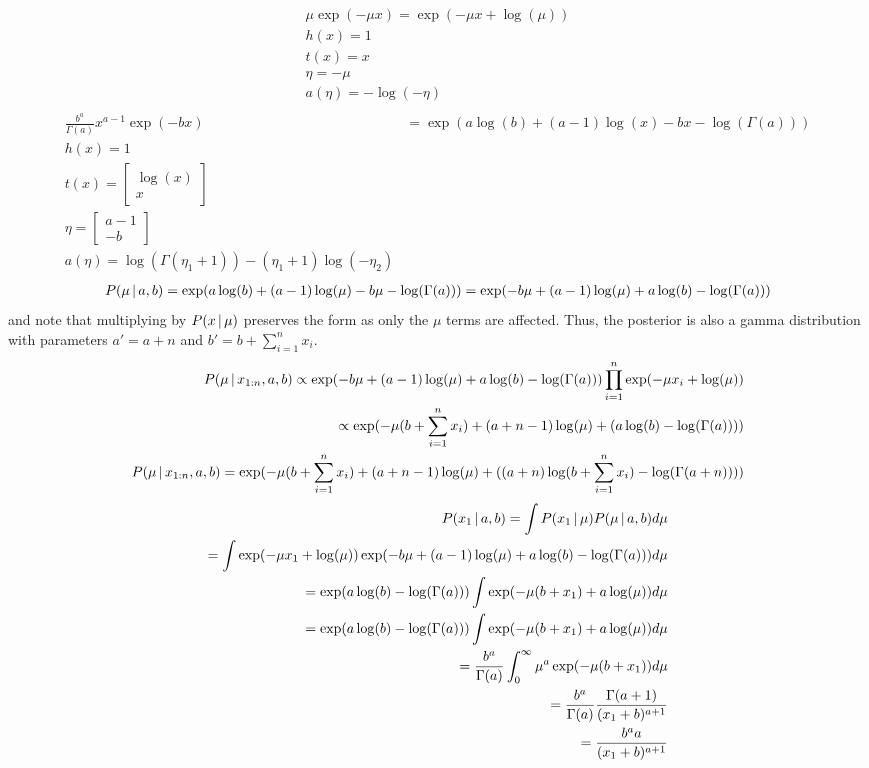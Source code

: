 \documentclass[hidequestions]{homework}
\begin{document}
%
\problem
\subproblem 
\begin{align*}
    \mu\exp(-\mu x) = \exp(-\mu x + \log(\mu))\\
    h(x) = 1\\
    t(x) = x\\
    \eta = -\mu\\
    a(\eta) = -\log(-\eta)\\
\end{align*}
\begin{align*}
    \frac{b^a}{\Gamma(a)}x^{a-1}\exp(-bx) &= \exp(a\log(b) + (a-1)\log(x) - bx - \log(\Gamma(a)))\\
    h(x) = 1\\
    t(x) = \begin{bmatrix}
        \log(x)\\
        x
    \end{bmatrix}\\
    \eta = \begin{bmatrix}
        a-1\\
        -b
    \end{bmatrix}\\
    a(\eta) =  \log(\Gamma(\eta_1 + 1)) - (\eta_1 + 1)\log(-\eta_2)
\end{align*}
\subproblem
\begin{align*}
    P(\mu \,\vert\, a,b) = \exp(a\log(b) + (a-1)\log(\mu) - b\mu - \log(\Gamma(a))) = \exp(- b\mu + (a-1)\log(\mu) + a\log(b) - \log(\Gamma(a)))
\end{align*}
and note that multiplying by $P(x \,\vert\, \mu)$ preserves the form as only the $\mu$ terms are affected. Thus, the posterior is also a gamma distribution with parameters $a' = a + n$ and $b' = b + \sum_{i=1}^n x_i$.
\subproblem 
\begin{align*}
    P(\mu \,\vert\, x_{1:n}, a, b) \propto \exp(- b\mu + (a-1)\log(\mu) + a\log(b) - \log(\Gamma(a)))\prod_{i=1}^n \exp(-\mu x_i + \log(\mu))\\
    \propto \exp(-\mu (b + \sum_{i=1}^n x_i) + (a + n - 1)\log(\mu) + (a\log(b) - \log(\Gamma(a))))\\
    P(\mu \,\vert\, x_{1:n}, a, b) = \exp(-\mu (b + \sum_{i=1}^n x_i) + (a + n - 1)\log(\mu) + ((a+n)\log(b+ \sum_{i=1}^n x_i) - \log(\Gamma(a+n))))\\
\end{align*}
\subproblem 
\begin{align*}
    P(x_1 \,\vert\, a,b) = \int P(x_1 \,\vert\, \mu)P(\mu \,\vert\, a,b)d\mu\\
     = \int \exp(-\mu x_1 + \log(\mu))\exp(- b\mu + (a-1)\log(\mu) + a\log(b) - \log(\Gamma(a)))d\mu\\
    = \exp( a\log(b) - \log(\Gamma(a))) \int \exp(-\mu(b + x_1) + a\log(\mu))d\mu\\
    = \exp( a\log(b) - \log(\Gamma(a))) \int \exp(-\mu(b + x_1) + a\log(\mu))d\mu\\
    = \frac{b^a}{\Gamma(a)} \int_0^\infty \mu^a \exp(-\mu(b + x_1)) d\mu\\
    = \frac{b^a}{\Gamma(a)} \frac{\Gamma(a+1)}{(x_1 + b)^{a+1}}\\
    = \frac{b^a a}{(x_1 + b)^{a+1}}
\end{align*}
\end{document}
